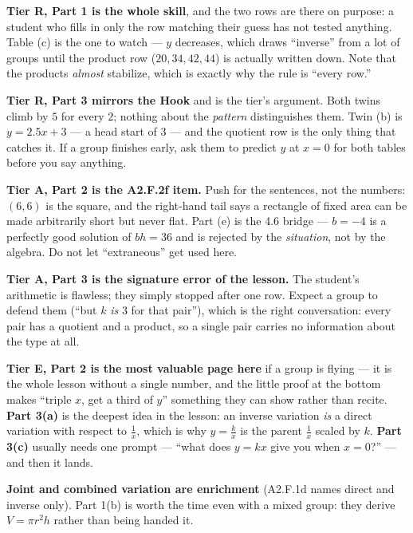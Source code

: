\documentclass[10pt]{article}
\begin{document}
\begin{teachernote}
\textbf{Tier R, Part 1 is the whole skill}, and the two rows are there on purpose: a student who fills
in only the row matching their guess has not tested anything. Table (c) is the one to watch --- $y$
decreases, which draws ``inverse'' from a lot of groups until the product row ($20, 34, 42, 44$) is
actually written down. Note that the products \emph{almost} stabilize, which is exactly why the rule
is ``every row.''

\vspace{3pt}
\textbf{Tier R, Part 3 mirrors the Hook} and is the tier's argument. Both twins climb by $5$ for every
$2$; nothing about the \emph{pattern} distinguishes them. Twin (b) is $y=2.5x+3$ --- a head start of
$3$ --- and the quotient row is the only thing that catches it. If a group finishes early, ask them to
predict $y$ at $x=0$ for both tables before you say anything.

\vspace{3pt}
\textbf{Tier A, Part 2 is the A2.F.2f item.} Push for the sentences, not the numbers: $(6,6)$ is the
square, and the right-hand tail says a rectangle of fixed area can be made arbitrarily short but never
flat. Part (e) is the 4.6 bridge --- $b=-4$ is a perfectly good solution of $bh=36$ and is rejected by
the \emph{situation}, not by the algebra. Do not let ``extraneous'' get used here.

\vspace{3pt}
\textbf{Tier A, Part 3 is the signature error of the lesson.} The student's arithmetic is flawless;
they simply stopped after one row. Expect a group to defend them (``but $k$ \emph{is} $3$ for that
pair''), which is the right conversation: every pair has a quotient and a product, so a single pair
carries no information about the type at all.

\vspace{3pt}
\textbf{Tier E, Part 2 is the most valuable page here} if a group is flying --- it is the whole lesson
without a single number, and the little proof at the bottom makes ``triple $x$, get a third of $y$''
something they can show rather than recite. \textbf{Part 3(a)} is the deepest idea in the lesson: an
inverse variation \emph{is} a direct variation with respect to $\frac1x$, which is why $y=\frac kx$ is
the parent $\frac1x$ scaled by $k$. \textbf{Part 3(c)} usually needs one prompt --- ``what does $y=kx$
give you when $x=0$?'' --- and then it lands.

\vspace{3pt}
\textbf{Joint and combined variation are enrichment} (A2.F.1d names direct and inverse only). Part 1(b)
is worth the time even with a mixed group: they derive $V=\pi r^2h$ rather than being handed it.
\end{teachernote}
\end{document}
